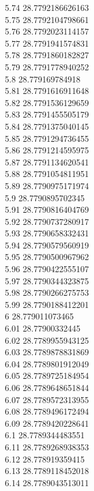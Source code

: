 {5.74	28.7792186626163\\
5.75	28.7792104798661\\
5.76	28.7792023114157\\
5.77	28.7791941574831\\
5.78	28.7791860182827\\
5.79	28.7791778940252\\
5.8	28.779169784918\\
5.81	28.7791616911648\\
5.82	28.7791536129659\\
5.83	28.7791455505179\\
5.84	28.7791375040145\\
5.85	28.7791294736455\\
5.86	28.7791214595975\\
5.87	28.7791134620541\\
5.88	28.7791054811951\\
5.89	28.7790975171974\\
5.9	28.7790895702345\\
5.91	28.7790816404769\\
5.92	28.7790737280917\\
5.93	28.7790658332431\\
5.94	28.7790579560919\\
5.95	28.7790500967962\\
5.96	28.7790422555107\\
5.97	28.7790344323875\\
5.98	28.7790266275753\\
5.99	28.7790188412201\\
6	28.779011073465\\
6.01	28.77900332445\\
6.02	28.7789955943125\\
6.03	28.7789878831869\\
6.04	28.7789801912049\\
6.05	28.7789725184954\\
6.06	28.7789648651844\\
6.07	28.7789572313955\\
6.08	28.7789496172494\\
6.09	28.7789420228641\\
6.1	28.7789344483551\\
6.11	28.7789268938353\\
6.12	28.778919359415\\
6.13	28.7789118452018\\
6.14	28.7789043513011\\
}
